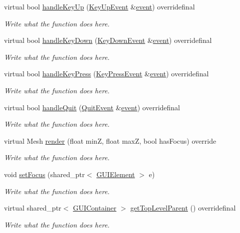 \begin{DoxyCompactItemize}
virtual bool \hyperlink{classGUIContainer_a6e1ad46740bab18d77efb8f88c3a70bb}{handle\+Key\+Up} (\hyperlink{classKeyUpEvent}{Key\+Up\+Event} \&\hyperlink{unionSDL__Event}{event}) overridefinal
\begin{DoxyCompactList}\small\item\em Write what the function does here. \end{DoxyCompactList}\item 
virtual bool \hyperlink{classGUIContainer_a8dec7de665719cb1e440a655fac6b69a}{handle\+Key\+Down} (\hyperlink{classKeyDownEvent}{Key\+Down\+Event} \&\hyperlink{unionSDL__Event}{event}) overridefinal
\begin{DoxyCompactList}\small\item\em Write what the function does here. \end{DoxyCompactList}\item 
virtual bool \hyperlink{classGUIContainer_a7109d4597eb95baa047e4de213f9428f}{handle\+Key\+Press} (\hyperlink{structKeyPressEvent}{Key\+Press\+Event} \&\hyperlink{unionSDL__Event}{event}) overridefinal
\begin{DoxyCompactList}\small\item\em Write what the function does here. \end{DoxyCompactList}\item 
virtual bool \hyperlink{classGUIContainer_a1fbd8dfea04418ce139b202961987255}{handle\+Quit} (\hyperlink{structQuitEvent}{Quit\+Event} \&\hyperlink{unionSDL__Event}{event}) overridefinal
\begin{DoxyCompactList}\small\item\em Write what the function does here. \end{DoxyCompactList}\item 
virtual Mesh \hyperlink{classGUIContainer_ac0c16fc5501929f38fd6d1b325d1c801}{render} (float min\+Z, float max\+Z, bool has\+Focus) override
\begin{DoxyCompactList}\small\item\em Write what the function does here. \end{DoxyCompactList}\item 
void \hyperlink{classGUIContainer_a231ba20b33175f315be9ea08ec00a6c4}{set\+Focus} (shared\+\_\+ptr$<$ \hyperlink{classGUIElement}{G\+U\+I\+Element} $>$ e)
\begin{DoxyCompactList}\small\item\em Write what the function does here. \end{DoxyCompactList}\item 
virtual shared\+\_\+ptr$<$ \hyperlink{classGUIContainer}{G\+U\+I\+Container} $>$ \hyperlink{classGUIContainer_a4bade45ffb4a8961ba2a3e0b406d186c}{get\+Top\+Level\+Parent} () overridefinal
\begin{DoxyCompactList}\small\item\em Write what the function does here. \end{DoxyCompactList}\end{DoxyCompactItemize}
